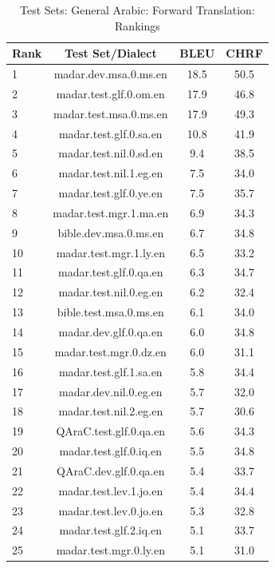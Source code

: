 \begin{table}[htbp]
\centering
\caption{Test Sets: General Arabic: Forward Translation: Rankings}
\label{tab:testset_ranking_forward_arabic_general}
\begin{tabular}{l@{\hspace{3pt}}c@{\hspace{3pt}}c@{\hspace{3pt}}c}
\toprule
Rank & Test Set/Dialect & BLEU & CHRF \\
\midrule
1 & madar.dev.msa.0.ms.en & 18.5 & 50.5 \\
2 & madar.test.glf.0.om.en & 17.9 & 46.8 \\
3 & madar.test.msa.0.ms.en & 17.9 & 49.3 \\
4 & madar.test.glf.0.sa.en & 10.8 & 41.9 \\
5 & madar.test.nil.0.sd.en & 9.4 & 38.5 \\
6 & madar.test.nil.1.eg.en & 7.5 & 34.0 \\
7 & madar.test.glf.0.ye.en & 7.5 & 35.7 \\
8 & madar.test.mgr.1.ma.en & 6.9 & 34.3 \\
9 & bible.dev.msa.0.ms.en & 6.7 & 34.8 \\
10 & madar.test.mgr.1.ly.en & 6.5 & 33.2 \\
11 & madar.test.glf.0.qa.en & 6.3 & 34.7 \\
12 & madar.test.nil.0.eg.en & 6.2 & 32.4 \\
13 & bible.test.msa.0.ms.en & 6.1 & 34.0 \\
14 & madar.dev.glf.0.qa.en & 6.0 & 34.8 \\
15 & madar.test.mgr.0.dz.en & 6.0 & 31.1 \\
16 & madar.test.glf.1.sa.en & 5.8 & 34.4 \\
17 & madar.dev.nil.0.eg.en & 5.7 & 32.0 \\
18 & madar.test.nil.2.eg.en & 5.7 & 30.6 \\
19 & QAraC.test.glf.0.qa.en & 5.6 & 34.3 \\
20 & madar.test.glf.0.iq.en & 5.5 & 34.8 \\
21 & QAraC.dev.glf.0.qa.en & 5.4 & 33.7 \\
22 & madar.test.lev.1.jo.en & 5.4 & 34.4 \\
23 & madar.test.lev.0.jo.en & 5.3 & 32.8 \\
24 & madar.test.glf.2.iq.en & 5.1 & 33.7 \\
25 & madar.test.mgr.0.ly.en & 5.1 & 31.0 \\

\end{tabular}
\end{table}
